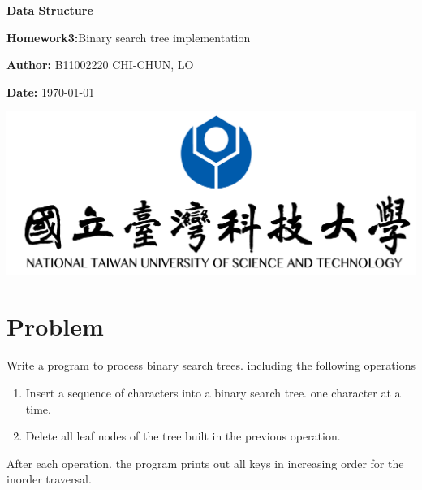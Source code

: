 \documentclass{article}
\begin{document}
	\begin{titlepage}
		\centering
		\vspace*{1cm}
		\Huge
		\textbf{Data Structure}
		
		\vspace{2cm}
		\LARGE
		\textbf{Homework3:}Binary search tree implementation
		
		\vspace{2cm}
		\textbf{Author:} B11002220 CHI-CHUN, LO
		
		\vspace{1cm}



		\textbf{Date: }\today
		
		\vfill
		\vspace{2cm}

    	\includegraphics[width=1\textwidth]{logo.png}
		
		
	\end{titlepage}
	\pagebreak
	\tableofcontents
	
	
	\pagebreak
	\section{Problem}	
	Write a program to process binary search trees. including the following operations
		\begin{enumerate}
			\item Insert a sequence of characters into a binary search tree. one character at a time.
			\item Delete all leaf nodes of the tree built in the previous operation. 
		\end{enumerate}
	After each operation. the program prints out all keys in increasing order for the inorder traversal. 
\end{document}
